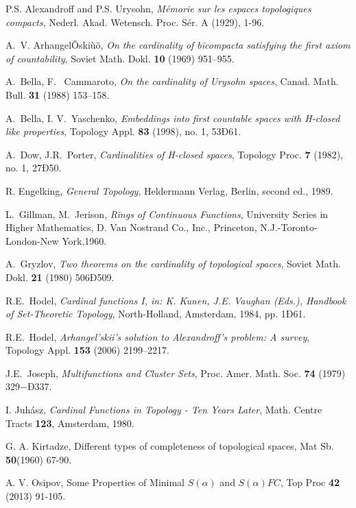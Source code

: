 \documentclass[11pt]{amsart}
\theoremstyle{definition}
\theoremstyle{remark}
\numberwithin{equation}{section}
\begin{document}
\begin{thebibliography}{21}

P.S. Alexandroff and P.S. Urysohn, \emph{M\' emorie sur les espaces topologiques compacts}, Nederl. Akad. Wetensch. Proc. Sér. A (1929), 1-96.

A.~V. ArhangelÕskiùõ, \emph{On the cardinality of bicompacta satisfying the first axiom of countability}, Soviet Math. Dokl. \textbf{10} (1969) 951--955.

A.~Bella, F.~ Cammaroto, \emph{On the cardinality of Urysohn spaces}, Canad. Math. Bull. \textbf{31} (1988) 153--158.

A.~Bella, I. V.~Yaschenko, \emph{Embeddings into first countable spaces with H-closed like properties},
Topology Appl. \textbf{83} (1998), no. 1, 53Ð61. 

A.~Dow, J.R.~Porter, \emph{Cardinalities of H-closed spaces}, Topology Proc. \textbf{7} (1982), no. 1, 27Ð50. 

R. Engelking, \emph{General {T}opology}, Heldermann Verlag, Berlin, second ed., 1989.

L.~Gillman, M.~Jerison, \emph{Rings of Continuous Functions}, University Series in Higher Mathematics, D. Van Nostrand Co., Inc., Princeton, N.J.-Toronto-London-New York,1960.

A.~Gryzlov, \emph{Two theorems on the cardinality of topological spaces}, Soviet Math. Dokl. \textbf{21} (1980) 506Ð509.

R.E.~Hodel, \emph{Cardinal functions I, in: K. Kunen, J.E. Vaughan (Eds.), Handbook of Set-Theoretic Topology}, North-Holland, Amsterdam, 1984, pp. 1Ð61.

R.E.~Hodel, \emph{Arhangel'skii's solution to Alexandroff's problem: A survey}, Topology Appl. \textbf{153} (2006) 2199--2217.

J.E.~Joseph, \emph{Multifunctions and Cluster Sets}, Proc. Amer. Math. Soc. \textbf{74} (1979) 329$-Ð$337.

I. Juh\'{a}sz, \emph{Cardinal Functions in Topology - Ten Years Later}, Math. Centre Tracts \textbf{123}, Amsterdam, 1980.

G. A. Kirtadze, Different types of completeness of topological spaces, Mat Sb. {\bf 50}(1960) 67-90.

A. V. Osipov, Some Properties of Minimal $S(\alpha)$ and $S(\alpha)FC$, Top Proc {\bf 42} (2013) 91-105.


\end{thebibliography}
\end{document}
